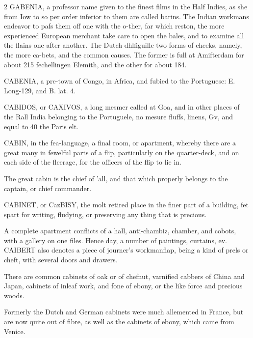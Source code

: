 \documentclass[10pt]{article}
\begin{document}
\begin{multicols}{2}
GABENIA, a professor name given to the finest films in the Half Indies, as she from Iow to so per order inferior to them are called barins. The Indian workmans endeavor to pafs them off one with the o-ther, far which reston, the more experienced European merchant take care to open the bales, and to examine all the flains one after another. The Dutch dhlfiguille two forms of cheeks, namely, the more ca-bets, and the common causes. The former is full at Amifterdam for about 215 fechellingen Elemith, and the other for about 184.

CABENIA, a pre-town of Congo, in Africa, and fubied to the Portuguese: E. Long-129, and B. lat. 4.

CABIDOS, or CAXIVOS, a long mesmer called at Goa, and in other places of the Rall India belonging to the Portuguele, no mesure fluffs, linens, Gv, and equal to 40 the Paris elt.

CABIN, in the fea-language, a final room, or apartment, whereby there are a great many in fewelful parts of a flip, particularly on the quarter-deck, and on each side of the fleerage, for the officers of the flip to lie in.

The great cabin is the chief of ’all, and that which properly belongs to the captain, or chief commander.

CABINET, or CazBISY, the molt retired place in the finer part of a building, fet spart for writing, fludying, or preserving any thing that is precious.

A complete apartment conflicts of a hall, anti-chambiz, chamber, and cobots, with a gallery on one files. Hence day, a number of paintings, curtains, ev. CAIBERT also denotes a piece of journer's workmanflap, being a kind of prels or cheft, with several doors and drawers.

There are common cabinets of oak or of chefnut, varnified cabbers of China and Japan, cabinets of inleaf work, and fone of ebony, or the like force and precious woods.

Formerly the Dutch and German cabinets were much allemented in France, but are now quite out of fibre, as well as the cabinets of ebony, which came from Venice.


\end{multicols}
\end{document}
